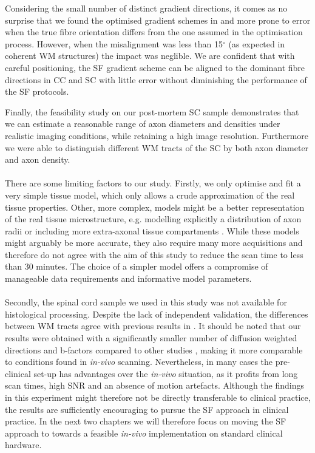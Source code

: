 Considering the small number of distinct gradient directions, it comes as no surprise that we found the optimised gradient schemes in {\FD} and {\DO} more prone to error when the true fibre orientation differs from the one assumed in the optimisation process. However, when the misalignment was less than 15$^\circ$ (as expected in coherent WM structures) the impact was neglible. We are confident that with careful positioning, the {\gls{SF}} gradient scheme can be aligned to the dominant fibre directions in CC and SC with little error without diminishing the performance of the {\gls{SF}} protocols.


Finally, the feasibility study on our post-mortem SC sample demonstrates that we can estimate a reasonable range of axon diameters and densities under realistic imaging conditions, while retaining a high image resolution. Furthermore we were able to distinguish different WM tracts of the SC by both axon diameter and axon density.
\paragraph{}
There are some limiting factors to our study. Firstly, we only optimise and fit a very simple tissue model, which only allows a crude approximation of the real tissue properties. Other, more complex, models might be a better representation of the real tissue microstructure, e.g. modelling explicitly a distribution of axon radii \citep{Barazany:2009} or including more extra-axonal tissue compartments \citep{Stanisz:1997,Wang:2011,Panagiotaki:2012}.  While these models might arguably be more accurate, they also require many more acquisitions and therefore do not agree with the aim of this study to reduce the scan time to less than 30 minutes. The choice of a simpler model offers a compromise of manageable data requirements and informative model parameters.
\paragraph{}
Secondly, the spinal cord sample we used in this study was not available for histological processing. Despite the lack of independent validation, the differences between WM tracts agree with previous results in \citep{Golabchi:2010}. It should be noted that our results were obtained with a significantly smaller number of diffusion weighted directions and b-factors compared to other studies \citep{Assaf:2008,Barazany:2009,Panagiotaki:2012}, making it more comparable to conditions found in \emph{in-vivo} scanning. Nevertheless, in many cases the pre-clinical set-up has advantages over the \emph{in-vivo} situation, as it profits from long scan times, high \gls{SNR} and an absence of motion artefacts. Although the findings in this experiment might therefore not be directly transferable to clinical practice, the results are sufficiently encouraging to pursue the \gls{SF}{} approach in clinical practice. In the next two chapters we will therefore focus on moving the \gls{SF}{} approach to towards a feasible \emph{in-vivo} implementation on standard clinical hardware.


